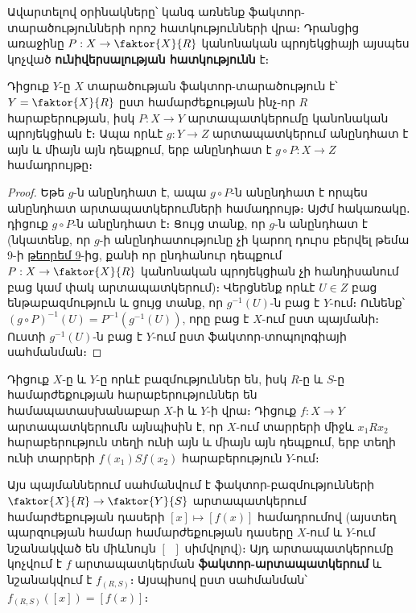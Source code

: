 \documentclass[./main.tex]{subfiles}
\begin{document}
\par Ավարտելով օրինակները՝ կանգ առնենք ֆակտոր-տարածությունների որոշ հատ\-կությունների վրա։ Դրանցից առաջինը $P:X\to \faktor{X}{R}$ կանոնական պրոյեկցիայի այսպես կոչ\-ված \textbf{ունիվերսալության հատկությունն} է։

\begin{theorem}\label{ch12thm1}
Դիցուք $Y$-ը $X$ տարածության ֆակտոր-տարածություն է՝ $Y=\faktor{X}{R}$ ըստ համարժեքության ինչ-որ $R$ հարաբերության, իսկ $P:X\to Y$ արտապատկե\-րու\-մը կանոնական պրոյեկցիան է։ Ապա որևէ $g:Y\to Z$ արտապատկերում անընդ\-հատ է այն և միայն այն դեպքում, երբ անընդհատ է $g\circ P:X\to Z$ համադրույթը։
\end{theorem}

\begin{proof} 
Եթե $g$-ն անընդհատ է, ապա $g\circ P$-ն անընդ\-հատ է որպես անընդ\-հատ արտապատկերումների համադրույթ։ Այժմ հակառակը․ դիցուք $g\circ P$-ն ան\-ընդ\-հատ է։ Ցույց տանք, որ $g$-ն անընդհատ է (նկատենք, որ $g$-ի ա\-նընդ\-հա\-տու\-թյու\-նը չի կարող դուրս բերվել թեմա 9-ի \hyperref[ch9thm9]{թեորեմ 9}-ից, քանի որ ընդհանուր դեպքում \linebreak $P:X\to \faktor{X}{R}$ կանոնական պրոյեկցիան չի հանդիսանում բաց կամ փակ ար\-տա\-պատ\-կե\-րում)։ Վերցնենք որևէ $U\in Z$ բաց ենթաբազմություն և ցույց տանք, որ $g^{-1} (U)$-ն բաց է $Y$-ում։ Ունենք՝ $(g\circ P)^{-1} (U)=P^{-1} (g^{-1} (U))$, որը բաց է $X$-ում ըստ պայ\-մա\-նի։ Ուստի $g^{-1} (U)$-ն բաց է $Y$-ում ըստ ֆակտոր-տոպոլոգիայի սահմանման։
\end{proof}


\par Դիցուք $X$-ը և $Y$-ը որևէ բազմություններ են, իսկ $R$-ը և $S$-ը համարժեքության հա\-րա\-բերություններ են համապատասխանաբար $X$-ի և $Y$-ի վրա։ Դիցուք ${f: X \to Y}$ արտապատկերումն այնպիսին է, որ $X$-ում տարրերի միջև $x_1 R x_2$ հարաբերություն տեղի ունի այն և միայն այն դեպքում, երբ տեղի ունի տարրերի $f(x_1) S f(x_2)$ հարա\-բե\-րու\-թյուն $Y$-ում։

\par Այս պայմաններում սահմանվում է ֆակտոր-բազմությունների $\faktor{X}{R} \to \faktor{Y}{S}$ \linebreak արտա\-պատկերում համարժեքության դասերի $[x] \mapsto [f(x)]$ համադրումով (այստեղ պար\-զու\-թյան համար համարժեքության դասերը $X$-ում և $Y$-ում նշանակված են միևնույն $[\;\;]$ սիմվոլով)։ Այդ արտապատկերումը կոչվում է $f$ արտապատկերման \textbf{ֆակտոր-ար\-տա\-պատկերում} և նշանակվում է $f_{(R,S)}$։ Այսպիսով ըստ սահմանման՝ $f_{(R,S)}\left([x]\right) = \left[f(x)\right]$։
\end{document}
